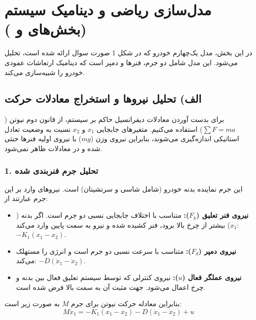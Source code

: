 \documentclass[a4paper]{article}
\begin{document}
	
	\section{مدل‌سازی ریاضی و دینامیک سیستم (بخش‌های  و )}
	در این بخش، مدل یک‌چهارم خودرو  که در شکل 1 صورت سوال ارائه شده است، تحلیل می‌شود. این مدل شامل دو جرم، فنرها و دمپر است که دینامیک ارتعاشات عمودی خودرو را شبیه‌سازی می‌کند.
	
	\subsection{الف) تحلیل نیروها و استخراج معادلات حرکت}
	برای بدست آوردن معادلات دیفرانسیل حاکم بر سیستم، از قانون دوم نیوتن ($\sum F = ma$) استفاده می‌کنیم. متغیرهای جابجایی $x_1$ و $x_2$ نسبت به وضعیت تعادل استاتیکی اندازه‌گیری می‌شوند، بنابراین نیروی وزن ($mg$) با نیروی اولیه فنرها خنثی شده و در معادلات ظاهر نمی‌شود.
	
	\subsubsection*{1. تحلیل جرم فنربندی شده }
	این جرم نماینده بدنه خودرو (شامل شاسی و سرنشینان) است. نیروهای وارد بر این جرم عبارتند از:
	\begin{itemize}
		\item \textbf{نیروی فنر تعلیق ($F_k$):} متناسب با اختلاف جابجایی نسبی دو جرم است. اگر بدنه ($x_1$) بیشتر از چرخ بالا برود، فنر کشیده شده و نیرو به سمت پایین وارد می‌کند: $-K_1(x_1 - x_2)$.
		\item \textbf{نیروی دمپر ($F_d$):} متناسب با سرعت نسبی دو جرم است و انرژی را مستهلک می‌کند: $-D(\dot{x}_1 - \dot{x}_2)$.
		\item \textbf{نیروی عملگر فعال ($u$):} نیروی کنترلی که توسط سیستم تعلیق فعال بین بدنه و چرخ اعمال می‌شود. جهت مثبت آن به سمت بالا فرض شده است.
	\end{itemize}
	
	بنابراین معادله حرکت نیوتن برای جرم $M$ به صورت زیر است:
	\begin{equation} \label{eq:M_dynamic}
		M \ddot{x}_1 = -K_1(x_1 - x_2) - D(\dot{x}_1 - \dot{x}_2) + u
	\end{equation}
	
\end{document}
